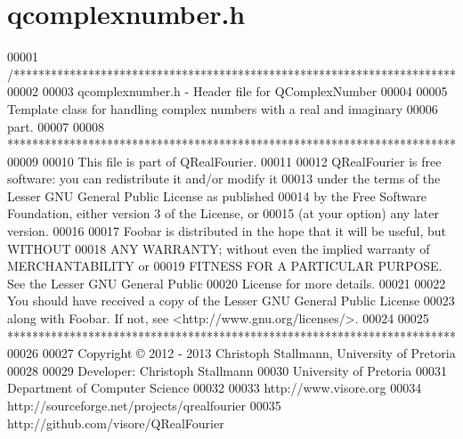 \hypertarget{a00114_source}{\section{qcomplexnumber.\+h}
\label{a00114_source}
}

\begin{DoxyCode}
00001 \textcolor{comment}{/***********************************************************************}
00002 \textcolor{comment}{}
00003 \textcolor{comment}{qcomplexnumber.h - Header file for QComplexNumber}
00004 \textcolor{comment}{}
00005 \textcolor{comment}{Template class for handling complex numbers with a real and imaginary}
00006 \textcolor{comment}{part. }
00007 \textcolor{comment}{}
00008 \textcolor{comment}{************************************************************************}
00009 \textcolor{comment}{}
00010 \textcolor{comment}{This file is part of QRealFourier.}
00011 \textcolor{comment}{}
00012 \textcolor{comment}{QRealFourier is free software: you can redistribute it and/or modify it}
00013 \textcolor{comment}{under the terms of the Lesser GNU General Public License as published}
00014 \textcolor{comment}{by the Free Software Foundation, either version 3 of the License, or}
00015 \textcolor{comment}{(at your option) any later version.}
00016 \textcolor{comment}{}
00017 \textcolor{comment}{Foobar is distributed in the hope that it will be useful, but WITHOUT}
00018 \textcolor{comment}{ANY WARRANTY; without even the implied warranty of MERCHANTABILITY or}
00019 \textcolor{comment}{FITNESS FOR A PARTICULAR PURPOSE.  See the Lesser GNU General Public}
00020 \textcolor{comment}{License for more details.}
00021 \textcolor{comment}{}
00022 \textcolor{comment}{You should have received a copy of the Lesser GNU General Public License}
00023 \textcolor{comment}{along with Foobar.  If not, see <http://www.gnu.org/licenses/>.}
00024 \textcolor{comment}{}
00025 \textcolor{comment}{************************************************************************}
00026 \textcolor{comment}{}
00027 \textcolor{comment}{Copyright © 2012 - 2013 Christoph Stallmann, University of Pretoria}
00028 \textcolor{comment}{}
00029 \textcolor{comment}{Developer: Christoph Stallmann}
00030 \textcolor{comment}{University of Pretoria}
00031 \textcolor{comment}{Department of Computer Science}
00032 \textcolor{comment}{}
00033 \textcolor{comment}{http://www.visore.org}
00034 \textcolor{comment}{http://sourceforge.net/projects/qrealfourier}
00035 \textcolor{comment}{http://github.com/visore/QRealFourier}

\end{DoxyCode}
